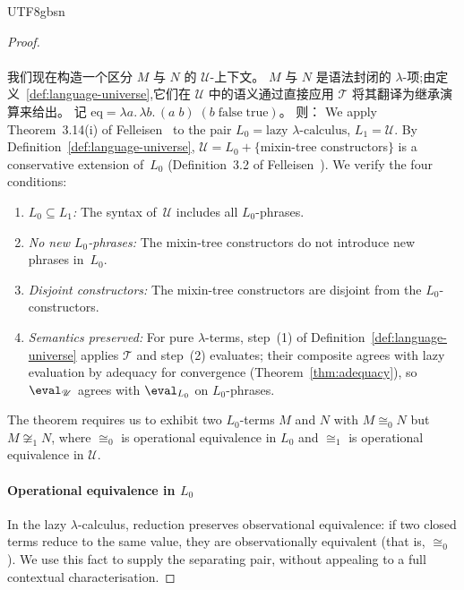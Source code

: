 \begin{CJK*}{UTF8}{gbsn}
\begin{proof}
  \paragraph{}
  我们现在构造一个区分 $M$ 与 $N$ 的 $\mathscr{U}$-上下文。
  $M$ 与 $N$ 是语法封闭的 $\lambda$-项;由定义~\ref{def:language-universe},它们在 $\mathscr{U}$ 中的语义通过直接应用 $\mathcal{T}$ 将其翻译为继承演算来给出。
  记 $\mathrm{eq} = \lambda a.\,\lambda b.\, (a\;b)\;(b\;\mathrm{false}\;\mathrm{true})$。
  则：
  \else
  We apply Theorem~3.14(i) of
  Felleisen~\cite{felleisen1991-expressive-power} to the pair
  $L_0 = \text{lazy $\lambda$-calculus}$,
  $L_1 = \mathscr{U}$.
  By Definition~\ref{def:language-universe},
  $\mathscr{U} = L_0 + \{$mixin-tree constructors$\}$
  is a conservative extension of~$L_0$
  (Definition~3.2 of
  Felleisen~\cite{felleisen1991-expressive-power}).
  We verify the four conditions:
  \begin{enumerate}
    \item[(i)] \emph{$L_0 \subseteq L_1$:}
      The syntax of~$\mathscr{U}$ includes all
      $L_0$-phrases.
    \item[(ii)] \emph{No new $L_0$-phrases:}
      The mixin-tree constructors do not introduce new
      phrases in~$L_0$.
    \item[(iii)] \emph{Disjoint constructors:}
      The mixin-tree constructors are disjoint from the
      $L_0$-constructors.
    \item[(iv)] \emph{Semantics preserved:}
      For pure $\lambda$-terms, step~(1) of
      Definition~\ref{def:language-universe} applies
      $\mathcal{T}$ and step~(2) evaluates; their
      composite agrees with lazy evaluation by adequacy for convergence
      (Theorem~\ref{thm:adequacy}), so
      $\eval_{\mathscr{U}}$ agrees with
      $\eval_{L_0}$ on $L_0$-phrases.
  \end{enumerate}
  The theorem requires us to exhibit two $L_0$-terms
  $M$ and $N$ with $M \cong_0 N$ but
  $M \not\cong_1 N$, where $\cong_0$ is operational
  equivalence in $L_0$ and $\cong_1$ is operational
  equivalence in $\mathscr{U}$.

  \paragraph{Operational equivalence in $L_0$}
  In the lazy $\lambda$-calculus, reduction preserves
  observational equivalence: if two closed terms reduce to the
  same value, they are observationally equivalent (that is,
  $\cong_0$). We use this fact to supply the separating pair,
  without appealing to a full contextual characterisation.


\end{proof}
\end{CJK*}

